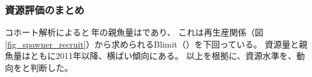 \subsubsection{資源評価のまとめ}
コホート解析によると{\ThisYr}\,年の親魚量は\makeatletter{}\makeatother であり、
これは再生産関係（図\,\ref{fig_spawner_recruit}）から求められるBlimit（\makeatletter{}\makeatother）を下回っている。
資源量と親魚量はともに2011年以降、横ばい傾向にある。
以上を根拠に、資源水準を{\StockLevel}、動向を{\StockTrend}と判断した。
